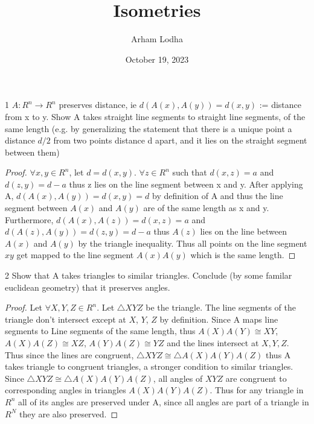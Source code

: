 \documentclass{article}
\begin{document}
\title{Isometries}
\author{Arham Lodha}%
\date{October 19, 2023}%
\maketitle

\begin{PROB}{1}\label{Problem 1.}
    $A: R^n \to R^n$ preserves distance, ie $d(A(x), A(y)) = d(x,y)$ := distance from x to y.  
    Show A takes straight line segments to straight line segments, of the same length (e.g. by generalizing the statement that there is a unique point a distance $d/2$ from two points distance d apart, and it lies on the straight segment between them)
\end{PROB}
\begin{proof}
    $\forall x, y \in R^n$, let $d = d(x, y)$. $\forall z \in R^n$ such that $d(x, z) = a$ and $d(z, y) = d - a$ thus z lies on the line segment between x and y. After applying A, $d(A(x), A(y)) = d(x, y) = d$ by definition of A and thus the line segment between $A(x)$ and $A(y)$ are of the same length as x and y. Furthermore, $d(A(x), A(z)) = d(x, z) = a$ and $d(A(z), A(y)) = d(z, y) = d - a$ thus $A(z)$ lies on the line between $A(x)$ and $A(y)$ by the triangle inequality. Thus all points on the line segment $xy$ get mapped to the line segment $A(x)A(y)$ which is the same length.
\end{proof}

\bigskip

\begin{PROB}{2}\label{Problem 2.}
    Show that A takes triangles to similar triangles. Conclude (by some familar euclidean geometry) that it preserves angles. 
\end{PROB}
\begin{proof}
    Let $\forall X, Y, Z \in R^n$. Let $\triangle XYZ$ be the triangle. The line segments of the triangle don't intersect except at $X$, $Y$, $Z$ by definition. Since A maps line segments to Line segments of the same length, thus $A(X)A(Y) \cong XY$, $A(X)A(Z) \cong XZ$, $A(Y)A(Z) \cong YZ$ and the lines intersect at $X, Y, Z$. Thus since the lines are congruent, $\triangle XYZ \cong \triangle A(X)A(Y)A(Z)$ thus A takes triangle to congruent triangles, a stronger condition to similar triangles. Since $\triangle XYZ \cong \triangle A(X)A(Y)A(Z)$, all angles of $XYZ$ are congruent to corresponding angles in triangles $A(X)A(Y)A(Z)$. Thus for any triangle in $R^n$ all of its angles are preserved under A, since all angles are part of a triangle in $R^N$ they are also preserved.
\end{proof}
\end{document}
